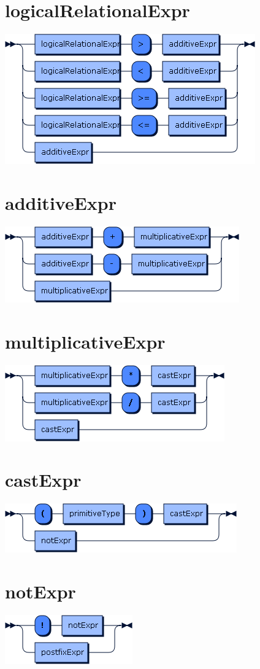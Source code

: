 \begin{appendices}
\section*{logicalRelationalExpr}\includegraphics[scale=0.7]{img/ebnf_grammar/logicalRelationalExpr}
\section*{additiveExpr}\includegraphics[scale=0.7]{img/ebnf_grammar/additiveExpr}
\section*{multiplicativeExpr}\includegraphics[scale=0.7]{img/ebnf_grammar/multiplicativeExpr}
\section*{castExpr}\includegraphics[scale=0.7]{img/ebnf_grammar/castExpr}
\section*{notExpr}\includegraphics[scale=0.7]{img/ebnf_grammar/notExpr}

\end{appendices}
